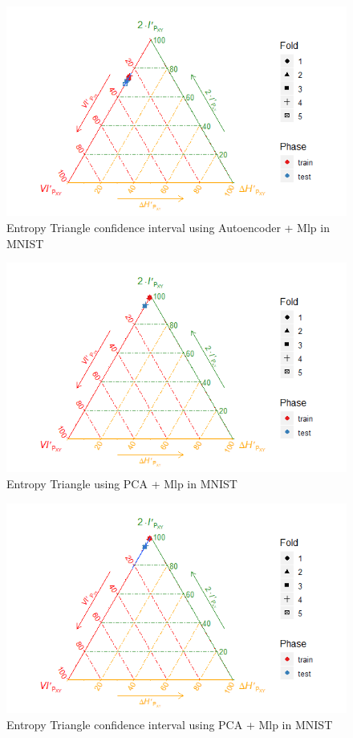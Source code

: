 \begin{figure}[H]
	\centering
	\includegraphics[width=1\linewidth]{Figuras_tfg/MNIST_Autoencoder_mlp_Confidence}
	\caption{Entropy Triangle confidence interval using Autoencoder + Mlp in MNIST}
    \label{fig:figure_Mlp_MNIST_ET_Auto_Confidence}
\end{figure}

\begin{figure}[H]
	\centering
	\includegraphics[width=1\linewidth]{Figuras_tfg/MNIST_PCA_mlp}
	\caption{Entropy Triangle using PCA + Mlp in MNIST}
	\label{fig:figure_Mlp_MNIST_ET_PCA}
\end{figure}

\begin{figure}[H]
	\centering
	\includegraphics[width=1\linewidth]{Figuras_tfg/MNIST_PCA_mlp_Confidence}
	\caption{Entropy Triangle confidence interval using PCA + Mlp in MNIST}
	\label{fig:figure_Mlp_MNIST_ET_PCA_Confidence}
\end{figure}

